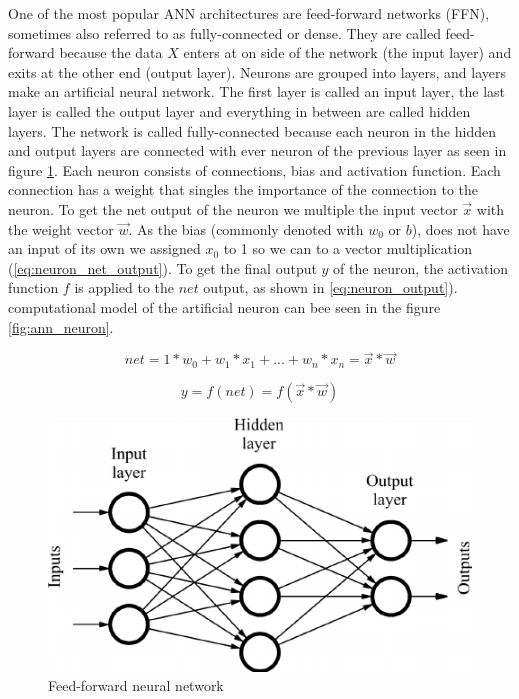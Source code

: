 \documentclass[times, utf8, diplomski]{fer}
\begin{document}
One of the most popular ANN architectures are feed-forward networks (FFN), sometimes also referred to as fully-connected or dense. They are called feed-forward because the data $X$ enters at on side of the network (the input layer) and exits at the other end (output layer). Neurons are grouped into layers, and layers make an artificial neural network. The first layer is called an input layer, the last layer is called the output layer and everything in between are called hidden layers. The network is called fully-connected because each neuron in the hidden and output layers are connected with ever neuron of the previous layer as seen in figure \ref{fig:ann}.
Each neuron consists of connections, bias and activation function. Each connection has a weight that singles the importance of the connection to the neuron. To get the net output of the neuron we multiple the input vector $\vec{x}$ with the weight vector $\vec{w}$. As the bias (commonly denoted with $w_0$ or $b$), does not have an input of its own we assigned $x_0$ to 1 so we can to a vector multiplication (\ref{eq:neuron_net_output}). To get the final output $y$ of the neuron, the activation function $f$ is applied to the $net$ output, as shown in \ref{eq:neuron_output}). computational model of the artificial neuron can bee seen in the figure \ref{fig:ann_neuron}.

\begin{equation}
	\label{eq:neuron_net_output}
	net = 1*w_0 + w_1*x_1 + ... + w_n*x_n = \vec{x} * \vec{w}
\end{equation}

\begin{equation}
	\label{eq:neuron_output}
	y = f(net) = f(\vec{x}*\vec{w})
\end{equation}

\begin{figure}
  \includegraphics[width=\linewidth]{figures/ann.png}
  \caption{Feed-forward neural network}
  \label{fig:ann}
\end{figure}
\end{document}
